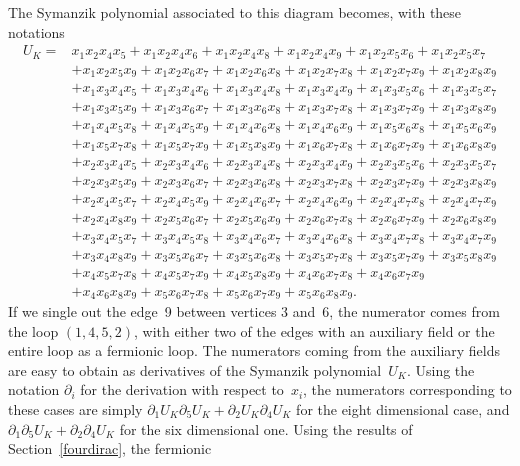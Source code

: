 \documentclass[pdftex]{sigma}
\numberwithin{equation}{section}
\begin{document}
The Symanzik polynomial associated to this diagram becomes, with these notations
\begin{align*}
 U_K ={}& x_1x_2x_4x_5 +x_1x_2x_4x_6 +x_1x_2x_4x_8 +x_1x_2x_4x_9 +x_1x_2x_5x_6 +x_1x_2x_5x_7
 \\
 &+x_1x_2x_5x_9 +x_1x_2x_6x_7 +x_1x_2x_6x_8 +x_1x_2x_7x_8 +x_1x_2x_7x_9 +x_1x_2x_8x_9
 \\
 &+x_1x_3x_4x_5 +x_1x_3x_4x_6 +x_1x_3x_4x_8 +x_1x_3x_4x_9 +x_1x_3x_5x_6 +x_1x_3x_5x_7
 \\
 &+x_1x_3x_5x_9 +x_1x_3x_6x_7 +x_1x_3x_6x_8 +x_1x_3x_7x_8 +x_1x_3x_7x_9 +x_1x_3x_8x_9
 \\
 &+x_1x_4x_5x_8 +x_1x_4x_5x_9 +x_1x_4x_6x_8 +x_1x_4x_6x_9 +x_1x_5x_6x_8 +x_1x_5x_6x_9
 \\
 &+x_1x_5x_7x_8 +x_1x_5x_7x_9 +x_1x_5x_8x_9 +x_1x_6x_7x_8 +x_1x_6x_7x_9 +x_1x_6x_8x_9 \\
 &+x_2x_3x_4x_5 +x_2x_3x_4x_6 +x_2x_3x_4x_8 +x_2x_3x_4x_9 +x_2x_3x_5x_6 +x_2x_3x_5x_7 \\
 &+x_2x_3x_5x_9 +x_2x_3x_6x_7 +x_2x_3x_6x_8 +x_2x_3x_7x_8 +x_2x_3x_7x_9 +x_2x_3x_8x_9
 \\
 &+x_2x_4x_5x_7 +x_2x_4x_5x_9 +x_2x_4x_6x_7 +x_2x_4x_6x_9 +x_2x_4x_7x_8 +x_2x_4x_7x_9
 \\
 &+x_2x_4x_8x_9 +x_2x_5x_6x_7 +x_2x_5x_6x_9 +x_2x_6x_7x_8 +x_2x_6x_7x_9 +x_2x_6x_8x_9
 \\
 &+x_3x_4x_5x_7 +x_3x_4x_5x_8 +x_3x_4x_6x_7 +x_3x_4x_6x_8 +x_3x_4x_7x_8 +x_3x_4x_7x_9
 \\
 &+x_3x_4x_8x_9 +x_3x_5x_6x_7 +x_3x_5x_6x_8 +x_3x_5x_7x_8 +x_3x_5x_7x_9 +x_3x_5x_8x_9 \\
 &+x_4x_5x_7x_8 +x_4x_5x_7x_9 +x_4x_5x_8x_9 +x_4x_6x_7x_8 +x_4x_6x_7x_9 \\
 &+x_4x_6x_8x_9 +x_5x_6x_7x_8 +x_5x_6x_7x_9 +x_5x_6x_8x_9.
\end{align*}
If we single out the edge~9 between vertices 3 and~6, the numerator comes from the loop $(1,4,5,2)$, with either two of
the edges with an auxiliary field or the entire loop as a fermionic loop. The numerators coming from the auxiliary fields
are easy to obtain as derivatives of the Symanzik polynomial~$U_K$. Using the notation $\partial_i$ for the
derivation with respect to~$x_i$, the numerators corresponding to these cases are simply $\partial_1 U_K \partial_5
U_K + \partial_2 U_K \partial_4 U_K$ for the eight dimensional case, and $\partial_1 \partial_5 U_K +
\partial_2 \partial_4 U_K$ for the six dimensional one. Using the results of Section~\ref{fourdirac}, the fermionic
\end{document}
